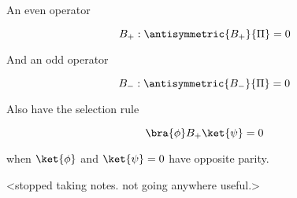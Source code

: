 An even operator

\begin{equation}\label{eqn:qmTwoR1:150}
B_{+} : \antisymmetric{B_{+}}{\Pi} = 0
\end{equation}

And an odd operator

\begin{equation}\label{eqn:qmTwoR1:170}
B_{-} : \antisymmetric{B_{-}}{\Pi} = 0
\end{equation}

Also have the selection rule

\begin{equation}\label{eqn:qmTwoR1:190}
\bra{\phi} B_{+} \ket{\psi} = 0
\end{equation}

when $\ket{\phi}$ and $\ket{\psi} = 0$ have opposite parity.

<stopped taking notes.  not going anywhere useful.>


\EndArticle

